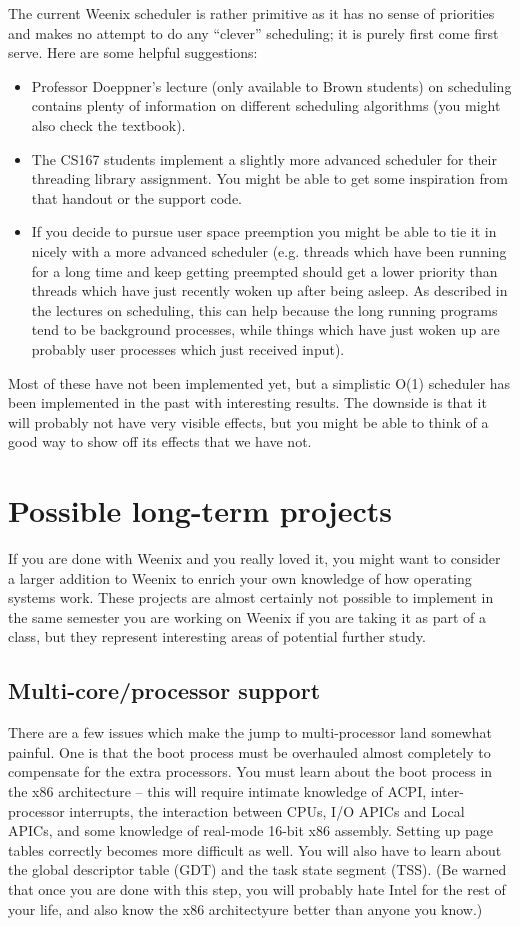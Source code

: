 The current Weenix scheduler is rather primitive as it has no sense of priorities and makes no attempt to do any ``clever'' scheduling; it is purely first come first serve. Here are some helpful suggestions:
\begin{itemize}
    \item Professor Doeppner's lecture (only available to Brown students) on scheduling contains plenty of information on different scheduling algorithms (you might also check the textbook).
    \item The CS167 students implement a slightly more advanced scheduler for their threading library assignment. You might be able to get some inspiration from that handout or the support code.
    \item If you decide to pursue user space preemption you might be able to tie it in nicely with a more advanced scheduler (e.g. threads which have been running for a long time and keep getting preempted should get a lower priority than threads which have just recently woken up after being asleep. As described in the lectures on scheduling, this can help because the long running programs tend to be background processes, while things which have just woken up are probably user processes which just received input). %
\end{itemize}

Most of these have not been implemented yet, but a simplistic O(1) scheduler has been implemented in the past with interesting results. The downside is that it will probably not have very visible effects, but you might be able to think of a good way to show off its effects that we have not.

\section{Possible long-term projects}
If you are done with Weenix and you really loved it, you might want to consider a larger addition to Weenix to enrich your own knowledge of how operating systems work. These projects are almost certainly not possible to implement in the same semester you are working on Weenix if you are taking it as part of a class, but they represent interesting areas of potential further study.

\subsection{Multi-core/processor support}
There are a few issues which make the jump to multi-processor land somewhat painful. One is that the boot process must be overhauled almost completely to compensate for the extra processors. You must learn about the boot process in the x86 architecture -- this will require intimate knowledge of ACPI, inter-processor interrupts, the interaction between CPUs, I/O APICs and Local APICs, and some knowledge of real-mode 16-bit x86 assembly. Setting up page tables correctly becomes more difficult as well. You will also have to learn about the global descriptor table (GDT) and the task state segment (TSS). (Be warned that once you are done with this step, you will probably hate Intel for the rest of your life, and also know the x86 architectyure better than anyone you know.)

